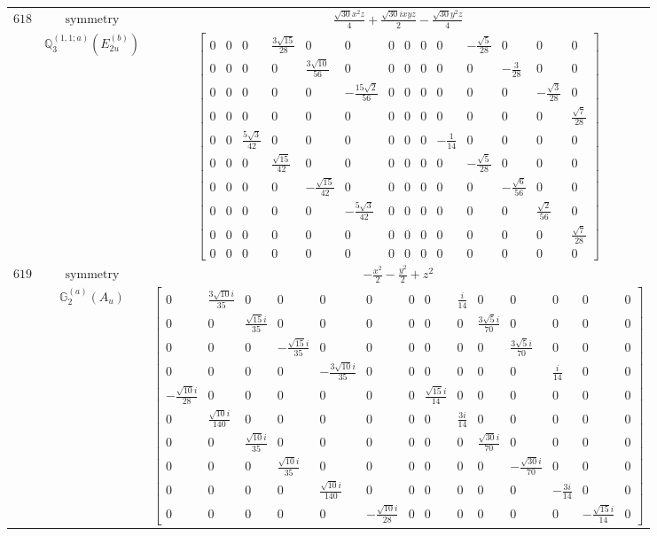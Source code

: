 \documentclass[fleqn,8pt,landscape]{jsarticle}
\begin{document}
\begin{longtable}{ccc}
$ 618 $ & $ \text{symmetry} $ & $ \frac{\sqrt{30} x^{2} z}{4} + \frac{\sqrt{30} i x y z}{2} - \frac{\sqrt{30} y^{2} z}{4} $ \\
$  $ & $ \mathbb{Q}_{3}^{(1,1;a)}(E_{2u}^{(b)}) $ & $ \begin{bmatrix} 0 & 0 & 0 & \frac{3 \sqrt{15}}{28} & 0 & 0 & 0 & 0 & 0 & 0 & - \frac{\sqrt{5}}{28} & 0 & 0 & 0 \\ 0 & 0 & 0 & 0 & \frac{3 \sqrt{10}}{56} & 0 & 0 & 0 & 0 & 0 & 0 & - \frac{3}{28} & 0 & 0 \\ 0 & 0 & 0 & 0 & 0 & - \frac{15 \sqrt{2}}{56} & 0 & 0 & 0 & 0 & 0 & 0 & - \frac{\sqrt{3}}{28} & 0 \\ 0 & 0 & 0 & 0 & 0 & 0 & 0 & 0 & 0 & 0 & 0 & 0 & 0 & \frac{\sqrt{7}}{28} \\ 0 & 0 & \frac{5 \sqrt{3}}{42} & 0 & 0 & 0 & 0 & 0 & 0 & - \frac{1}{14} & 0 & 0 & 0 & 0 \\ 0 & 0 & 0 & \frac{\sqrt{15}}{42} & 0 & 0 & 0 & 0 & 0 & 0 & - \frac{\sqrt{5}}{28} & 0 & 0 & 0 \\ 0 & 0 & 0 & 0 & - \frac{\sqrt{15}}{42} & 0 & 0 & 0 & 0 & 0 & 0 & - \frac{\sqrt{6}}{56} & 0 & 0 \\ 0 & 0 & 0 & 0 & 0 & - \frac{5 \sqrt{3}}{42} & 0 & 0 & 0 & 0 & 0 & 0 & \frac{\sqrt{2}}{56} & 0 \\ 0 & 0 & 0 & 0 & 0 & 0 & 0 & 0 & 0 & 0 & 0 & 0 & 0 & \frac{\sqrt{7}}{28} \\ 0 & 0 & 0 & 0 & 0 & 0 & 0 & 0 & 0 & 0 & 0 & 0 & 0 & 0 \end{bmatrix} $ \\ \hline
$ 619 $ & $ \text{symmetry} $ & $ - \frac{x^{2}}{2} - \frac{y^{2}}{2} + z^{2} $ \\
$  $ & $ \mathbb{G}_{2}^{(a)}(A_{u}) $ & $ \begin{bmatrix} 0 & \frac{3 \sqrt{10} i}{35} & 0 & 0 & 0 & 0 & 0 & 0 & \frac{i}{14} & 0 & 0 & 0 & 0 & 0 \\ 0 & 0 & \frac{\sqrt{15} i}{35} & 0 & 0 & 0 & 0 & 0 & 0 & \frac{3 \sqrt{5} i}{70} & 0 & 0 & 0 & 0 \\ 0 & 0 & 0 & - \frac{\sqrt{15} i}{35} & 0 & 0 & 0 & 0 & 0 & 0 & \frac{3 \sqrt{5} i}{70} & 0 & 0 & 0 \\ 0 & 0 & 0 & 0 & - \frac{3 \sqrt{10} i}{35} & 0 & 0 & 0 & 0 & 0 & 0 & \frac{i}{14} & 0 & 0 \\ - \frac{\sqrt{10} i}{28} & 0 & 0 & 0 & 0 & 0 & 0 & \frac{\sqrt{15} i}{14} & 0 & 0 & 0 & 0 & 0 & 0 \\ 0 & \frac{\sqrt{10} i}{140} & 0 & 0 & 0 & 0 & 0 & 0 & \frac{3 i}{14} & 0 & 0 & 0 & 0 & 0 \\ 0 & 0 & \frac{\sqrt{10} i}{35} & 0 & 0 & 0 & 0 & 0 & 0 & \frac{\sqrt{30} i}{70} & 0 & 0 & 0 & 0 \\ 0 & 0 & 0 & \frac{\sqrt{10} i}{35} & 0 & 0 & 0 & 0 & 0 & 0 & - \frac{\sqrt{30} i}{70} & 0 & 0 & 0 \\ 0 & 0 & 0 & 0 & \frac{\sqrt{10} i}{140} & 0 & 0 & 0 & 0 & 0 & 0 & - \frac{3 i}{14} & 0 & 0 \\ 0 & 0 & 0 & 0 & 0 & - \frac{\sqrt{10} i}{28} & 0 & 0 & 0 & 0 & 0 & 0 & - \frac{\sqrt{15} i}{14} & 0 \end{bmatrix} $ \\ \hline

\end{longtable}
\end{document}
